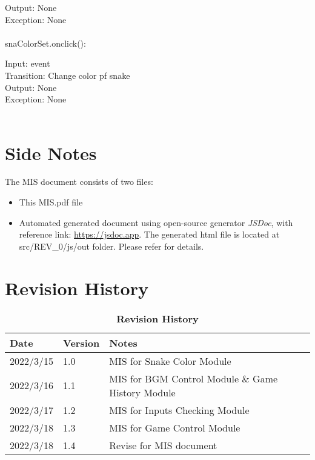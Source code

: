 \documentclass[12pt, titlepage]{article}
\begin{document}
		Output: None\\
		
		Exception: None\\
		\\
		snaColorSet.onclick():
		
		Input: event\\
		
		Transition: Change color pf snake\\
		
		Output: None\\
		
		Exception: None\\
		\\
	
	
\section{Side Notes}
The MIS document consists of two files:
\begin{itemize}
	\item This MIS.pdf file
	\item Automated generated document using open-source generator \emph{JSDoc}, with reference link: \url{https://jsdoc.app}. 
	The generated html file is located at src/REV\_0/js/out folder. Please refer for details.
\end{itemize}

\section{Revision History}
\begin{table}[bp]
\begin{tabularx}{\textwidth}{p{3cm}p{2cm}X}
\toprule {\bf Date} & {\bf Version} & {\bf Notes}\\
\midrule
2022/3/15 & 1.0 & MIS for Snake Color Module\\
2022/3/16 & 1.1 & MIS for BGM Control Module \& Game History Module\\
2022/3/17 & 1.2 & MIS for Inputs Checking Module\\
2022/3/18 & 1.3 & MIS for Game Control Module\\
2022/3/18 & 1.4 & Revise for MIS document\\
\bottomrule
\end{tabularx}
\caption{\bf Revision History}
\end{table}

			
\end{document}
